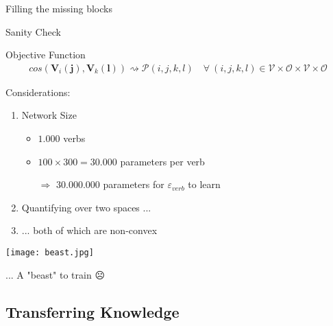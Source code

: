 \documentclass{beamer}
\begin{document}
\begin{frame}{Filling the missing blocks}
\begin{figure}
\end{figure}
\end{frame}

\begin{frame}{Sanity Check}
\begin{block}{Objective Function}
\begin{align*}
cos(\pmb{V}_i(\pmb{j}), \pmb{V}_k(\pmb{l})) \rightsquigarrow \mathcal{P}(i,j,k,l) 
\quad
\forall \ (i,j,k,l) \in \mathcal{V} \times \mathcal{O} \times \mathcal{V} \times \mathcal{O}
\end{align*}
\end{block}

\pause
Considerations:
\begin{enumerate}
\item Network Size\\
\begin{itemize}
\item $1.000$ verbs
\item $100 \times 300 = 30.000$ parameters per verb
\item[$\Rightarrow$]  \alert{ $ 30.000.000 $ parameters} for $\varepsilon_{verb}$ to learn
\end{itemize}
\pause
\item Quantifying over \alert{two spaces} ...
\pause
\item ... both of which are \alert{non-convex}
\end{enumerate}
\end{frame}

\begin{frame}[standout]
\texttt{[image: beast.jpg]}

... A "beast" to train {\DejaSans ☹} 
\end{frame}


\subsection{Transferring Knowledge}
\end{document}
